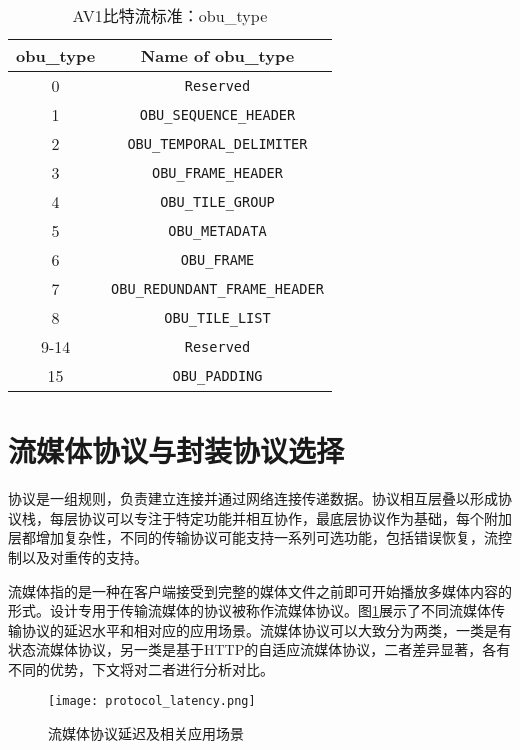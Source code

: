 \begin{table}[!hpt]
    \renewcommand{\arraystretch}{0.8}
    \caption[obu\_type]{AV1比特流标准：obu\_type}
    \label{tab:obutype}
    \centering
    \begin{tabular}{cc} \toprule
      obu\_type & Name of obu\_type\\ \midrule
      0    & \texttt{Reserved}  \\
      1    & \texttt{OBU\_SEQUENCE\_HEADER}     \\
      2    & \texttt{OBU\_TEMPORAL\_DELIMITER}   \\
      3    & \texttt{OBU\_FRAME\_HEADER}   \\
      4    & \texttt{OBU\_TILE\_GROUP}     \\
      5    & \texttt{OBU\_METADATA}     \\
      6    & \texttt{OBU\_FRAME}     \\
      7    & \texttt{OBU\_REDUNDANT\_FRAME\_HEADER}     \\
      8    & \texttt{OBU\_TILE\_LIST}     \\
      9-14 & \texttt{Reserved}     \\
      15   & \texttt{OBU\_PADDING}     \\ \bottomrule
    \end{tabular}
  \end{table}


\section{流媒体协议与封装协议选择}

协议是一组规则，负责建立连接并通过网络连接传递数据。协议相互层叠以形成协议栈，每层协议可以专注于特定功能并相互协作，最底层协议作为基础，每个附加层都增加复杂性，不同的传输协议可能支持一系列可选功能，包括错误恢复，流控制以及对重传的支持。

流媒体指的是一种在客户端接受到完整的媒体文件之前即可开始播放多媒体内容的形式。设计专用于传输流媒体的协议被称作流媒体协议。图\ref{fig:protocol-latency}展示了不同流媒体传输协议的延迟水平和相对应的应用场景。流媒体协议可以大致分为两类，一类是有状态流媒体协议，另一类是基于HTTP的自适应流媒体协议，二者差异显著，各有不同的优势，下文将对二者进行分析对比。

\begin{figure}[!htp]
	\centering
	\texttt{[image: protocol\_latency.png]}
	\caption{流媒体协议延迟及相关应用场景\cite{2019VideoStreaming2019}}
	\label{fig:protocol-latency}
\end{figure}

